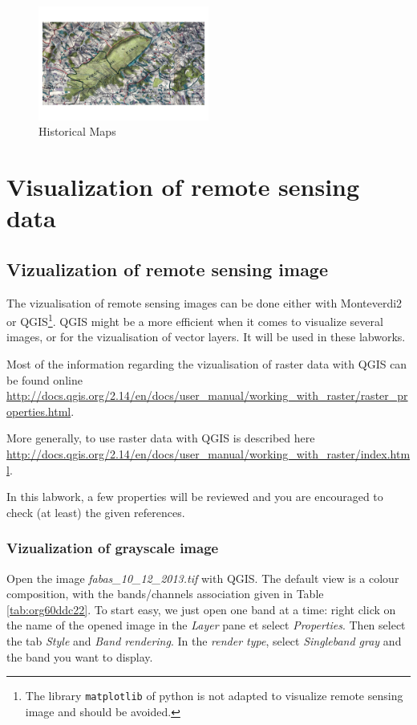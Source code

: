 \documentclass[a4paper,11pt,DIV=18]{scrartcl}
\begin{document}
\begin{figure}[htbp]
\centering
\includegraphics[width=0.5\textwidth]{figures/old_map.jpg}
\caption{\label{fig:org3e6e901}
Historical Maps}
\end{figure}

\section{Visualization of remote sensing data}
\label{sec:org659d3de}
\subsection{Vizualization of remote sensing image}
\label{sec:orga6a7757}
The vizualisation  of remote  sensing images can  be done  either with
Monteverdi2  or QGIS\footnote{The  library \texttt{matplotlib}  of  python is  not
adapted to  visualize remote  sensing image  and should  be avoided.}.
QGIS might  be a  more efficient  when it  comes to  visualize several
images, or for the vizualisation of  vector layers. It will be used in
these labworks.

Most of  the information  regarding the  vizualisation of  raster data
with         QGIS         can          be         found         online
\url{http://docs.qgis.org/2.14/en/docs/user\_manual/working\_with\_raster/raster\_properties.html}.

More  generally,  to use  raster  data  with  QGIS is  described  here
\url{http://docs.qgis.org/2.14/en/docs/user\_manual/working\_with\_raster/index.html}.

In  this labwork,  a  few  properties will  be  reviewed  and you  are
encouraged to check (at least) the given references.

\subsubsection{Vizualization of grayscale image}
\label{sec:orgc79ea0f}
Open the image  \emph{fabas\_10\_12\_2013.tif} with QGIS. The default  view is a
colour composition, with the bands/channels association given in Table
\ref{tab:org60ddc22}. To start easy, we just open  one band at a time: right click
on  the  name  of  the  opened  image in  the  \emph{Layer}  pane  et  select
\emph{Properties}.   Then select  the tab  \emph{Style} and  \emph{Band rendering}.  In the
\emph{render type}, select \emph{Singleband gray} and the band you want to display.
\end{document}
